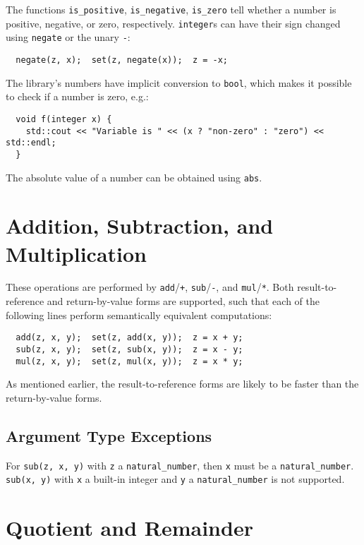 \documentclass[a4paper]{article}
\begin{document}
The functions \texttt{is\_positive}, \texttt{is\_negative}, \texttt{is\_zero} tell whether a number is positive, negative, or zero, respectively. \texttt{integer}s can have their sign changed using \texttt{negate} or the unary \texttt{-}:
\begin{verbatim}
  negate(z, x);  set(z, negate(x));  z = -x;
\end{verbatim}

The library's numbers have implicit conversion to \texttt{bool}, which makes it possible to check if a number is zero, e.g.:
\begin{verbatim}
  void f(integer x) {
    std::cout << "Variable is " << (x ? "non-zero" : "zero") << std::endl;
  }
\end{verbatim}

The absolute value of a number can be obtained using \texttt{abs}.


\section{Addition, Subtraction, and Multiplication}

These operations are performed by \texttt{add}/\texttt{+}, \texttt{sub}/\texttt{-}, and \texttt{mul}/\texttt{*}. Both result-to-reference and return-by-value forms are supported, such that each of the following lines perform semantically equivalent computations:
\begin{verbatim}
  add(z, x, y);  set(z, add(x, y));  z = x + y;
  sub(z, x, y);  set(z, sub(x, y));  z = x - y;
  mul(z, x, y);  set(z, mul(x, y));  z = x * y;
\end{verbatim}
As mentioned earlier, the result-to-reference forms are likely to be faster than the return-by-value forms.

\subsection{Argument Type Exceptions}

For \texttt{sub(z, x, y)} with \texttt{z} a \texttt{natural\_number}, then \texttt{x} must be a \texttt{natural\_number}. \texttt{sub(x, y)} with \texttt{x} a built-in integer and \texttt{y} a \texttt{natural\_number} is not supported.

\section{Quotient and Remainder}
\end{document}
